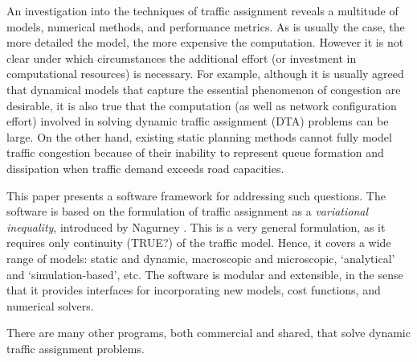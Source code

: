 An investigation into the techniques of traffic assignment reveals a multitude of models, numerical methods, and performance metrics.  As is usually the case, the more detailed the model, the more expensive the computation. However it is not clear under which circumstances the additional effort (or investment in computational resources) is necessary. For example, although it is usually agreed that dynamical models that capture the essential phenomenon of congestion are desirable, it is also true that the computation (as well as network configuration effort) involved in solving dynamic traffic assignment (DTA) problems can be large. On the other hand, existing static planning methods cannot fully model traffic congestion because of their inability to represent queue formation and dissipation when traffic demand exceeds road capacities\cite{nie2010solving}. 

This paper presents a software framework for addressing such questions. The software is based on the formulation of traffic assignment as a \textit{variational inequality}, introduced by Nagurney \cite{nagurney2013network}. This is a very general formulation, as it requires only continuity (\XXX TRUE?) of the traffic model. Hence, it covers a wide range of models: static and dynamic, macroscopic and microscopic, `analytical' and `simulation-based', etc. The software is modular and extensible, in the sense that it provides interfaces for incorporating new models, cost functions, and numerical solvers. 

There are many other programs, both commercial and shared, that solve dynamic traffic assignment problems. 



